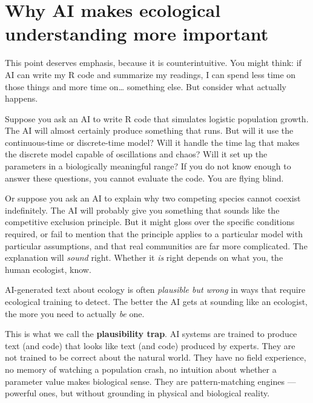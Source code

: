 \documentclass[
  letterpaper,
  DIV=11,
  numbers=noendperiod]{scrreprt}
\begin{document}
\section{Why AI makes ecological understanding more
important}\label{why-ai-makes-ecological-understanding-more-important}

This point deserves emphasis, because it is counterintuitive. You might
think: if AI can write my R code and summarize my readings, I can spend
less time on those things and more time on\ldots{} something else. But
consider what actually happens.

Suppose you ask an AI to write R code that simulates logistic population
growth. The AI will almost certainly produce something that runs. But
will it use the continuous-time or discrete-time model? Will it handle
the time lag that makes the discrete model capable of oscillations and
chaos? Will it set up the parameters in a biologically meaningful range?
If you do not know enough to answer these questions, you cannot evaluate
the code. You are flying blind.

Or suppose you ask an AI to explain why two competing species cannot
coexist indefinitely. The AI will probably give you something that
sounds like the competitive exclusion principle. But it might gloss over
the specific conditions required, or fail to mention that the principle
applies to a particular model with particular assumptions, and that real
communities are far more complicated. The explanation will \emph{sound}
right. Whether it \emph{is} right depends on what you, the human
ecologist, know.

\begin{tcolorbox}[enhanced jigsaw, toprule=.15mm, colframe=quarto-callout-important-color-frame, bottomrule=.15mm, arc=.35mm, breakable, leftrule=.75mm, rightrule=.15mm, bottomtitle=1mm, coltitle=black, left=2mm, titlerule=0mm, title=\textcolor{quarto-callout-important-color}{\faExclamation}\hspace{0.5em}{The Plausibility Trap}, toptitle=1mm, colbacktitle=quarto-callout-important-color!10!white, opacityback=0, colback=white, opacitybacktitle=0.6]

AI-generated text about ecology is often \emph{plausible but wrong} in
ways that require ecological training to detect. The better the AI gets
at sounding like an ecologist, the more you need to actually \emph{be}
one.

\end{tcolorbox}

This is what we call the \textbf{plausibility trap}. AI systems are
trained to produce text (and code) that looks like text (and code)
produced by experts. They are not trained to be correct about the
natural world. They have no field experience, no memory of watching a
population crash, no intuition about whether a parameter value makes
biological sense. They are pattern-matching engines --- powerful ones,
but without grounding in physical and biological reality.
\end{document}
